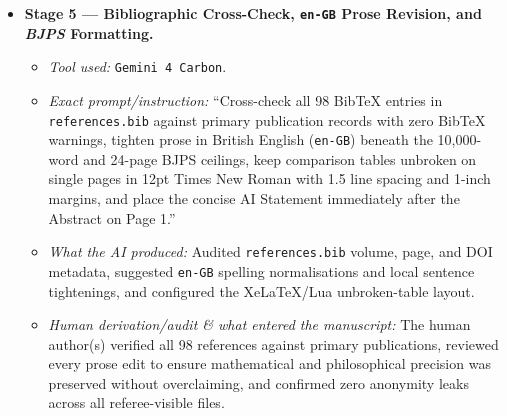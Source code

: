 \documentclass[12pt,letterpaper]{article}
\providecommand{\tightlist}{\setlength{\itemsep}{2pt}\setlength{\parskip}{0pt}}
\begin{document}
\begin{enumerate}
\begin{itemize}
    \begin{itemize}
    \tightlist
    \item
      \emph{Tool used:} \texttt{Gemini\ 4\ Carbon}.
    \item
      \emph{Exact prompt/instruction:} ``Write a reproducible
      Python/Matplotlib script (\texttt{generate\_figures.py})
      generating vector PDF and 300-DPI PNG files for Figures 1--3
      (physical register architecture and fixed-parameter four-founder
      protocol-law diamond lattice; five-state finite-memory viability
      witness and \((k_c, k_b)\) attainment phase diagram at \(q=1/3\);
      typed explanatory preservation and four stratified grounds of
      purpose with calibrated evidence-channel arrows) with zero
      overlapping labels and zero identifying metadata.''
    \item
      \emph{What the AI produced:} Generated
      \texttt{generate\_figures.py} rendering vector Figures 1--3 with
      embedded fonts and non-overlapping annotations.
    \item
      \emph{Human derivation/audit \& what entered the manuscript:} The
      human author(s) checked every plotted phase line (\(\lambda_0=1\),
      \(\lambda_1=1\), \(k_b=k_c\)), coordinate (\((11/12,25/24)\),
      \((9/8,5/4)\)), arrow, and PDF metadata field against Theorem 1
      and Propositions 3 and 6 before inclusion.
    \end{itemize}
  \item
    \textbf{Stage 5 --- Bibliographic Cross-Check, \texttt{en-GB} Prose
    Revision, and \emph{BJPS} Formatting.}

    \begin{itemize}
    \tightlist
    \item
      \emph{Tool used:} \texttt{Gemini\ 4\ Carbon}.
    \item
      \emph{Exact prompt/instruction:} ``Cross-check all 98 BibTeX
      entries in \texttt{references.bib} against primary publication
      records with zero BibTeX warnings, tighten prose in British
      English (\texttt{en-GB}) beneath the 10,000-word and 24-page BJPS
      ceilings, keep comparison tables unbroken on single pages in 12pt
      Times New Roman with 1.5 line spacing and 1-inch margins, and
      place the concise AI Statement immediately after the Abstract on
      Page 1.''
    \item
      \emph{What the AI produced:} Audited \texttt{references.bib}
      volume, page, and DOI metadata, suggested \texttt{en-GB} spelling
      normalisations and local sentence tightenings, and configured the
      XeLaTeX/Lua unbroken-table layout.
    \item
      \emph{Human derivation/audit \& what entered the manuscript:} The
      human author(s) verified all 98 references against primary
      publications, reviewed every prose edit to ensure mathematical and
      philosophical precision was preserved without overclaiming, and
      confirmed zero anonymity leaks across all referee-visible files.
    \end{itemize}
  \end{itemize}
\end{enumerate}

\clearpage
\begingroup
\onehalfspacing
\setlength{\bibsep}{4pt}


\endgroup
\end{document}
